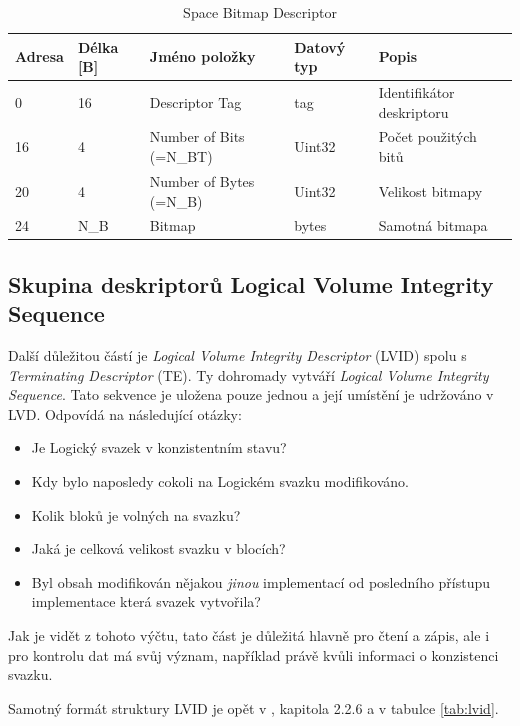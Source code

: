 \begin{table}[]
    \centering
    \begin{tabular}{ | l | l | p{4.2cm} | p{1.8cm} | p{5.5cm} | }
        \hline
        Adresa  & Délka [B]   & Jméno položky & Datový typ    & Popis \\ \hline\hline
        0   &16     & Descriptor Tag                    & tag           & Identifikátor deskriptoru \\ \hline
        16  &4      & Number of Bits (=N\_BT)           & Uint32        & Počet použitých bitů \\ \hline
        20  &4      & Number of Bytes (=N\_B)           & Uint32        & Velikost bitmapy \\ \hline
        24  &N\_B   & Bitmap                            & bytes         & Samotná bitmapa \\ \hline
    \end{tabular}
    \caption{Space Bitmap Descriptor\label{tab:sbd}}
\end{table}

\subsection{Skupina deskriptorů Logical Volume Integrity Sequence}
\label{subsec:lvid}
Další důležitou částí je \textit{Logical Volume Integrity Descriptor} (LVID) spolu s \textit{Terminating Descriptor} (TE). Ty dohromady vytváří \textit{Logical Volume Integrity Sequence}. Tato sekvence je uložena pouze jednou a její umístění je udržováno v LVD. Odpovídá na následující otázky:
\begin{itemize}
    \item Je Logický svazek v konzistentním stavu?
    \item Kdy bylo naposledy cokoli na Logickém svazku modifikováno.
    \item Kolik bloků je volných na svazku?
    \item Jaká je celková velikost svazku v blocích?
    \item Byl obsah modifikován nějakou \textit{jinou} implementací od posledního přístupu implementace která svazek vytvořila?
\end{itemize}
Jak je vidět z tohoto výčtu, tato část je důležitá hlavně pro čtení a zápis, ale i pro kontrolu dat má svůj význam, například právě kvůli informaci o konzistenci svazku.
 
Samotný formát struktury LVID je opět v \cite{osta-udf-0201}, kapitola 2.2.6 a v tabulce \ref{tab:lvid}.

